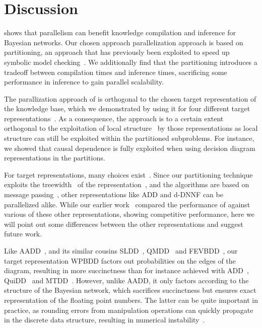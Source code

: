 
\section{Discussion}
\label{sec:conclusion}

\toolname shows that parallelism can benefit knowledge compilation and inference for Bayesian networks. Our chosen approach parallelization approach is based on partitioning, an approach that has previously been exploited to speed up symbolic model checking~\cite{grumberg2006work,narayan1996partitioned,sahoo2004partitioning}.  We additionally find that the partitioning introduces a tradeoff between compilation times and inference times, sacrificing some performance in inference to gain parallel scalability.




The parallization approach of \toolname is orthogonal to the chosen target representation of the knowledge base, which we demonstrated by using it for four different target representations~\cite{dal2018parallel}. As a consequence, the approach is to a certain extent orthogonal to the exploitation of local structure~\cite{chavira2005compiling} by those representations as local structure can still be exploited within the partitioned subproblems. For instance, we showed that causal dependence is fully exploited when using decision diagram representations in the partitions.


For target representations, many choices exist~\cite{darwiche2001decomposable,darwiche2011sdd,darwiche2002knowledge,fargier2014knowledge}. Since our partitioning technique exploits the treewidth~\cite{dechter1998bucket} of the representation~\cite[\S 5]{dal2021compositional}, and the algorithms are based on message passing~\cite[\S 4]{dal2021compositional}, other representations like ADD and d-DNNF can be parallelized alike. While our earlier work~\cite{dal2018parallel} compared the performance of \toolname against various of these other representations, showing competitive performance, here we will point out some differences between the other representations and suggest future work.


Like AADD~\cite{sanner2005affine}, and its similar cousins SLDD~\cite{wilson2005decision}, QMDD~\cite{miller2006qmdd} and FEVBDD~\cite{tafertshofer1997factored}, our target representation WPBDD factors out probabilities on the edges of the diagram, resulting in more succinctness than for instance achieved with ADD~\cite{bahar}, QuiDD~\cite{viamontes2003improving} and MTDD~\cite{Clarke2001}. However, unlike AADD, it only factors according to the structure of the Bayesian network, which sacrifices succinctness but ensures exact representation of the floating point numbers. The latter can be quite important in practice, as rounding errors from manipulation operations can quickly propagate in the discrete data structure, resulting in numerical instability~\cite{zulehner2019efficiently}.

